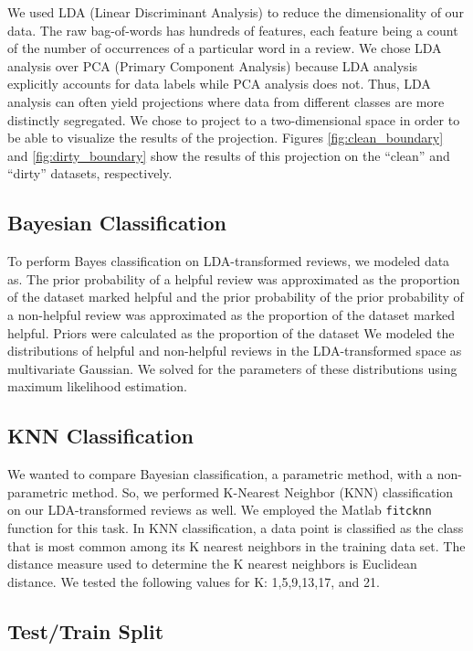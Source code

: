 We used LDA (Linear Discriminant Analysis) to reduce the dimensionality of our data.
The raw bag-of-words has hundreds of features, each feature being a count of the number of occurrences of a particular word in a review.
We chose LDA analysis over PCA (Primary Component Analysis) because LDA analysis explicitly accounts for data labels while PCA analysis does not.
Thus, LDA analysis can often yield projections where data from different classes are more distinctly segregated.
We chose to project to a two-dimensional space in order to be able to visualize the results of the projection.
Figures \ref{fig:clean_boundary} and \ref{fig:dirty_boundary} show the results of this projection on the ``clean'' and ``dirty'' datasets, respectively.

\subsection{Bayesian Classification}

To perform Bayes classification on LDA-transformed reviews, we modeled data as.
The prior probability of a helpful review was approximated as the proportion of the dataset marked helpful and the prior probability of the prior probability of a non-helpful review was approximated as the proportion of the dataset marked helpful.
Priors were calculated as the proportion of the dataset 
We modeled the distributions of helpful and non-helpful reviews in the LDA-transformed space as multivariate Gaussian.
We solved for the parameters of these distributions using maximum likelihood estimation.

\subsection{KNN Classification}

We wanted to compare Bayesian classification, a parametric method, with a non-parametric method.
So, we performed K-Nearest Neighbor (KNN) classification on our LDA-transformed reviews as well.
We employed the Matlab \texttt{fitcknn} function for this task.
In KNN classification, a data point is classified as the class that is most common among its K nearest neighbors in the training data set.
The distance measure used to determine the K nearest neighbors is Euclidean distance.
We tested the following values for K: 1,5,9,13,17, and 21.

\subsection{Test/Train Split}

